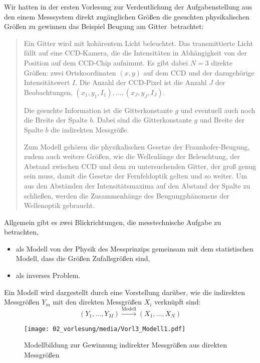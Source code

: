 Wir hatten in der ersten Vorlesung zur Verdeutlichung der Aufgabenstellung
aus den einem Messsystem direkt zugänglichen Größen die gesuchten physikalischen
Größen zu gewinnen das Beispiel \glqq Beugung am Gitter\grqq ~betrachtet:
\begin{quote}
Ein Gitter wird mit kohärentem Licht beleuchtet. Das transmittierte Licht fällt auf eine CCD-Kamera, die
die Intensitäten in Abhängigkeit von der Position auf dem CCD-Chip aufnimmt. Es gibt dabei $N = 3$ direkte Größen:
zwei Ortskoordinaten $(x, y)$ auf dem CCD und der dazugehörige Intensitätswert $I$. Die Anzahl der CCD-Pixel ist die
Anzahl $J$ der Beobachtungen, $(x_1, y_1, I_1), \dots, (x_J, y_J, I_J)$.

Die gesuchte Information ist die Gitterkonstante $g$ und eventuell auch noch die
Breite der Spalte $b$. Dabei sind die Gitterkonstante $g$ und Breite der Spalte $b$ 
die indirekten Messgröße. 

Zum Modell gehören die physikalischen Gesetze der Fraunhofer-Beugung, zudem auch weitere Größen,
wie die Wellenlänge der Beleuchtung, der Abstand zwischen CCD und dem zu untersuchenden Gitter,
der groß genug sein muss, damit die Gesetze der Fernfeldoptik gelten und so weiter.
Um aus den Abständen der Intensitätsmaxima auf den Abstand der Spalte zu schließen,
werden die Zusammenhänge des Beugungphänomens der Wellenoptik gebraucht.
\end{quote}

Allgemein gibt es zwei Blickrichtungen, die messtechnische Aufgabe zu betrachten,
\begin{itemize}
\item als Modell von der Physik des Messprinzips gemeinsam mit dem statistischen
Modell, dass die Größen Zufallsgrößen sind,
\item als inverses Problem.
\end{itemize}
Ein Modell wird dargestellt durch eine Vorstellung darüber, wie die
indirekten Messgrößen $Y_m$ mit den direkten Messgrößen $X_i$ verknüpft sind:
\begin{equation}
(Y_1, \dots, Y_M) \xrightarrow{\mathrm{Modell}} (X_1, \dots, X_N)
\label{forwardModel}
\end{equation} 
\begin{figure}
\begin{center}
\texttt{[image: 02\_vorlesung/media/Vorl3\_Modell1.pdf]}
\end{center}
\caption{Modellbildung zur Gewinnung indirekter Messgrößen aus direkten Messgrößen}
\end{figure}

